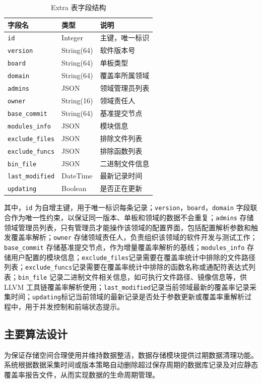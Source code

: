 \begin{table}
    \centering
    \caption{Extra 表字段结构}
    \label{tab:5.3}
    \begin{tabular}{lll}
    \toprule
    字段名 & 类型  & 说明 \\
    \midrule
    \verb|id| & Integer & 主键，唯一标识 \\
    \verb|version| & String(64) & 软件版本号 \\
    \verb|board| & String(64) & 单板类型 \\
    \verb|domain| & String(64) & 覆盖率所属领域 \\
    \verb|admins| & JSON & 领域管理员列表 \\
    \verb|owner| & String(16) & 领域责任人 \\
    \verb|base_commit| & String(64) & 基准提交节点 \\
    \verb|modules_info| & JSON & 模块信息 \\
    \verb|exclude_files| & JSON & 排除文件列表 \\
    \verb|exclude_funcs| & JSON & 排除函数列表 \\
    \verb|bin_file| & JSON & 二进制文件信息 \\
    \verb|last_modified| & DateTime & 最新记录时间 \\
    \verb|updating| & Boolean & 是否正在更新 \\
    \bottomrule
    \end{tabular}
\end{table}

其中，\verb|id| 为自增主键，用于唯一标识每条记录；\verb|version|，\verb|board|，\verb|domain| 字段联合作为唯一性约束，以保证同一版本、单板和领域的数据不会重复；\verb|admins| 存储领域管理员列表，只有管理员才能操作该领域的配置界面，包括配置解析参数和触发覆盖率解析；\verb|owner| 存储领域责任人，负责组织该领域的软件开发与测试工作；\verb|base_commit| 存储基准提交节点，作为增量覆盖率解析的基线；\verb|modules_info| 存储用户配置的模块信息；\verb|exclude_files|记录需要在覆盖率统计中排除的文件路径列表；\verb|exclude_funcs|记录需要在覆盖率统计中排除的函数名称或通配符表达式列表；\verb|bin_file| 记录二进制文件相关信息，如可执行文件路径、镜像信息等，供 LLVM 工具链覆盖率解析使用；\verb|last_modified|记录当前领域最新的覆盖率记录采集时间；\verb|updating|标记当前领域的最新记录是否处于参数更新或覆盖率重解析过程中，用于并发控制和前端状态提示。

\subsection{主要算法设计}
为保证存储空间合理使用并维持数据整洁，数据存储模块提供过期数据清理功能。系统根据数据采集时间或版本策略自动删除超过保存周期的数据库记录及对应静态覆盖率报告文件，从而实现数据的生命周期管理。

